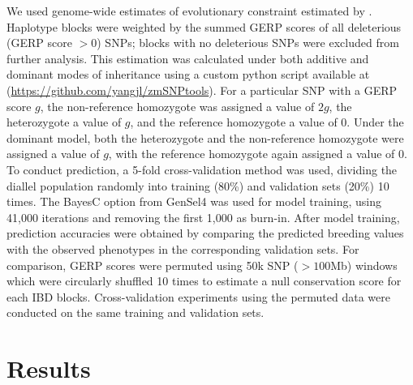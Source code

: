 \documentclass[9pt,twocolumn,twoside]{gsajnl}
\begin{document}
We used genome-wide estimates of evolutionary constraint \citep[GERP][]{Davydov2010} estimated by \citet{rodgers2015recombination}. 
Haplotype blocks were weighted by the summed GERP scores of all deleterious (GERP score $>0$) SNPs; blocks with no deleterious SNPs were excluded from further analysis. 
This estimation was calculated under both additive and dominant modes of inheritance using a custom python script available at (\url{https://github.com/yangjl/zmSNPtools}). 
For a particular SNP with a GERP score $g$, the non-reference homozygote was assigned a value of $2g$, the heterozygote a value of $g$, and the reference homozygote a value of 0.  
Under the dominant model, both the heterozygote and the non-reference homozygote were assigned a value of $g$, with the reference homozygote again assigned a value of 0.
To conduct prediction, a 5-fold cross-validation method was used, dividing the diallel population  randomly  into training (80\%) and validation sets (20\%)  10 times. 
The BayesC option from GenSel4 \citep{habier2011extension} was used for model training, using 41,000 iterations and removing the first 1,000 as burn-in. 
After model training, prediction accuracies were obtained by comparing the predicted breeding values with the observed phenotypes in the corresponding validation sets. 
For comparison, GERP scores were permuted using 50k SNP ($> 100$Mb) windows which were circularly shuffled 10 times to estimate a null conservation score for each IBD blocks. 
Cross-validation experiments using the permuted data were conducted on the same training and validation sets.  





\section*{Results}
\end{document}
